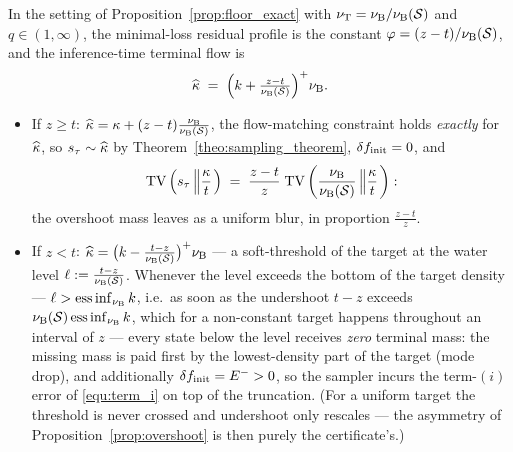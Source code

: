 \begin{proposition}
\label{prop:blur_vs_drop}
In the setting of Proposition~\ref{prop:floor_exact} with $\nu_{\mathrm{T}}=\nu_{\mathrm{B}}/\nu_{\mathrm{B}}(\mathcal S)$
and $q\in(1,\infty)$, the minimal-loss residual profile is the constant
$\varphi=(z-t)/\nu_{\mathrm{B}}(\mathcal S)$, and the inference-time terminal flow is
\begin{equation*}
    \widehat{\kappa} \;=\;\Bigl(k+\tfrac{z-t}{\nu_{\mathrm{B}}(\mathcal S)}\Bigr)^{+}\nu_{\mathrm{B}} .
\end{equation*}
\begin{itemize}
    \item If $z\geq t$: $\widehat{\kappa}=\kappa+(z-t)\frac{\nu_{\mathrm{B}}}{\nu_{\mathrm{B}}(\mathcal S)}$,
    the flow-matching constraint holds \emph{exactly} for $\widehat{\kappa}$, so
    $s_\tau\sim\widehat{\kappa}$ by Theorem~\ref{theo:sampling_theorem}, $\delta f_{\mathrm{init}}=0$, and
    \begin{equation}\label{equ:blur}
        \mathrm{TV}\left(s_\tau\left\|\frac{\kappa} t\right.\right)
        \;=\;\frac{z-t}{z}\;\mathrm{TV}\left(\frac{\nu_{\mathrm{B}}}{\nu_{\mathrm{B}}(\mathcal S)}
        \left\|\frac{\kappa} t\right.\right):
    \end{equation}
    the overshoot mass leaves as a uniform blur, in proportion $\frac{z-t}{z}$.
    \item If $z<t$: $\widehat{\kappa}=\bigl(k-\tfrac{t-z}{\nu_{\mathrm{B}}(\mathcal S)}\bigr)^+\nu_{\mathrm{B}}$
    --- a soft-threshold of the target at the water level
    $\ell:=\frac{t-z}{\nu_{\mathrm{B}}(\mathcal S)}$. Whenever the level exceeds the bottom of
    the target density --- $\ell>\operatorname*{ess\,inf}_{\nu_{\mathrm{B}}} k$, i.e.\ as soon as
    the undershoot $t-z$ exceeds $\nu_{\mathrm{B}}(\mathcal S)\operatorname*{ess\,inf}_{\nu_{\mathrm{B}}} k$,
    which for a non-constant target happens throughout an interval of $z$ ---
    every state below the level receives \emph{zero} terminal mass: the missing mass is
    paid first by the lowest-density part of the target (mode drop), and additionally
    $\delta f_{\mathrm{init}}=E^->0$, so the sampler incurs the term-$(i)$ error of
    \eqref{equ:term_i} on top of the truncation. (For a uniform target the threshold is
    never crossed and undershoot only rescales --- the asymmetry of
    Proposition~\ref{prop:overshoot} is then purely the certificate's.)
\end{itemize}
\end{proposition}

